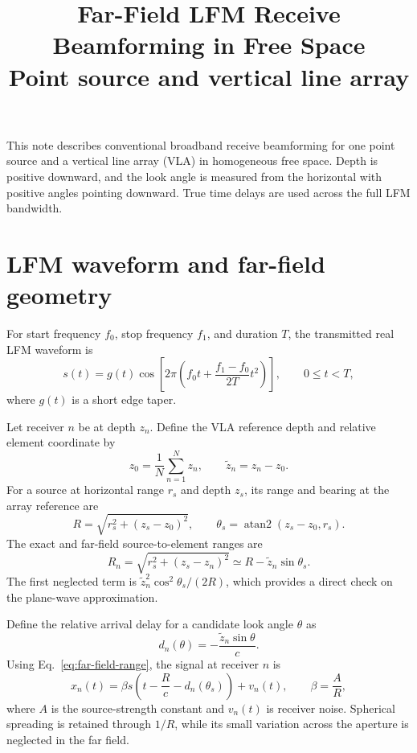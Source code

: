 \documentclass[10pt,a4paper]{article}
\title{\vspace{-1.3em}\textbf{Far-Field LFM Receive Beamforming in Free Space}\\
\large Point source and vertical line array}
\author{}
\date{}
\begin{document}
\maketitle
\vspace{-2.5em}

This note describes conventional broadband receive beamforming for one point source
and a vertical line array (VLA) in homogeneous free space. Depth is positive downward,
and the look angle is measured from the horizontal with positive angles pointing
downward. True time delays are used across the full LFM bandwidth.

\section{LFM waveform and far-field geometry}

For start frequency $f_0$, stop frequency $f_1$, and duration $T$, the transmitted
real LFM waveform is
\begin{equation}
 s(t)=g(t)\cos\!\left[2\pi\left(f_0t+\frac{f_1-f_0}{2T}t^2\right)\right],
 \qquad 0\leq t<T,
\end{equation}
where $g(t)$ is a short edge taper.

Let receiver $n$ be at depth $z_n$. Define the VLA reference depth and relative
element coordinate by
\begin{equation}
 z_0=\frac{1}{N}\sum_{n=1}^{N}z_n,
 \qquad \widetilde z_n=z_n-z_0.
\end{equation}
For a source at horizontal range $r_s$ and depth $z_s$, its range and bearing at the
array reference are
\begin{equation}
 R=\sqrt{r_s^2+(z_s-z_0)^2},
 \qquad
 \theta_s=\operatorname{atan2}(z_s-z_0,r_s).
\end{equation}
The exact and far-field source-to-element ranges are
\begin{equation}
 R_n=\sqrt{r_s^2+(z_s-z_n)^2}
 \simeq R-\widetilde z_n\sin\theta_s.
 \label{eq:far-field-range}
\end{equation}
The first neglected term is
$\widetilde z_n^2\cos^2\theta_s/(2R)$, which provides a direct check on the
plane-wave approximation.

Define the relative arrival delay for a candidate look angle $\theta$ as
\begin{equation}
 d_n(\theta)=-\frac{\widetilde z_n\sin\theta}{c}.
 \label{eq:relative-delay}
\end{equation}
Using Eq.~\eqref{eq:far-field-range}, the signal at receiver $n$ is
\begin{equation}
 x_n(t)=\beta s\!\left(t-\frac{R}{c}-d_n(\theta_s)\right)+v_n(t),
 \qquad \beta=\frac{A}{R},
 \label{eq:received-signal}
\end{equation}
where $A$ is the source-strength constant and $v_n(t)$ is receiver noise. Spherical
spreading is retained through $1/R$, while its small variation across the aperture is
neglected in the far field.
\end{document}
